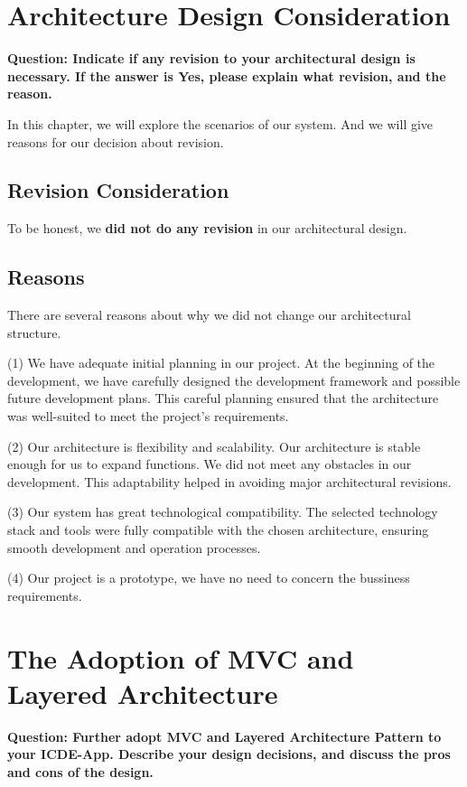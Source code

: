 \documentclass[conference]{IEEEtran}
\begin{document}
\section{\textbf{Architecture Design Consideration}}

\textbf{Question: Indicate if any revision to your architectural design is necessary. If the answer is Yes, please explain what revision, and the reason.}

In this chapter, we will explore the scenarios of our system. And we will give reasons for our decision about revision.

\subsection{\textbf{Revision Consideration}}

To be honest, we \textbf{did not do any revision} in our architectural design. 

\subsection{\textbf{Reasons}}

There are several reasons about why we did not change our architectural structure. 

(1) We have adequate initial planning in our project. At the beginning of the development, we have carefully designed the development framework and possible future development plans. This careful planning ensured that the architecture was well-suited to meet the project's requirements.

(2) Our architecture is flexibility and scalability. Our architecture is stable enough for us to expand functions. We did not meet any obstacles in our development. This adaptability helped in avoiding major architectural revisions.

(3) Our system has great technological compatibility. The selected technology stack and tools were fully compatible with the chosen architecture, ensuring smooth development and operation processes.

(4) Our project is a prototype, we have no need to concern the bussiness requirements. 


\section{\textbf{The Adoption of MVC and Layered Architecture}}

\textbf{Question: Further adopt MVC and Layered Architecture Pattern to your ICDE-App. Describe your design decisions, and discuss the pros and cons of the design.}
\end{document}
